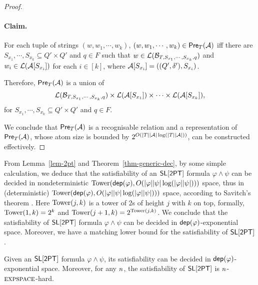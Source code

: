 \begin{proof}


\paragraph{Claim.} For each tuple of strings $(w, w_1,\cdots, w_k)$, $(w, w_1,\cdots, w_k) \in \textsf{Pre}_{T}(\mathcal{A})$ iff there are $S_{x_1}, \cdots, S_{x_k} \subseteq Q' \times Q'$ and $q \in F$ such that $w \in \mathcal{L}(\mathcal{B}_{T, S_{x_1}, \cdots, S_{x_k}, q})$ and $w_i \in \mathcal{L}(\mathcal{A}[S_{x_i}])$ for each $i \in [k]$, where $\mathcal{A}[S_{x_i}]=((Q', \delta'), S_{x_i})$.

\medskip


Therefore, $\textsf{Pre}_{T}(\mathcal{A})$ is a union of
\[\mathcal{L}(\mathcal{B}_{T, S_{x_1}, \cdots, S_{x_k},q}) \times \mathcal{L}(\mathcal{A}[S_{x_1}]) \times \cdots  \times \mathcal{L}(\mathcal{A}[S_{x_k}]), \]
for $S_{x_1}, \cdots, S_{x_k} \subseteq Q' \times Q'$ and $q \in F$. 


We conclude that $\textsf{Pre}_{T}(\mathcal{A})$ is a recognisable relation and a representation of $\textsf{Pre}_{T}(\mathcal{A})$, whose atom size is bounded by $2^{O(|T||\mathcal{A}|\log (|T||\mathcal{A}|))}$, can be constructed effectively.
\end{proof}

From Lemma~\ref{lem-2pt} and Theorem~\ref{thm-generic-dec}, by some simple calculation, we deduce that the satisfiability of an $\textsf{SL}[\textsf{2PT}]$ formula $\varphi \wedge \psi$ can be decided in 
nondeterministic $\mathrm{Tower}(\mathsf{dep}(\varphi), O(|\varphi| |\psi| \log(|\varphi| |\psi|) ))$ space, thus in (deterministic) $\mathrm{Tower}(\mathsf{dep}(\varphi), O(|\varphi| |\psi| \log(|\varphi| |\psi|) ))$ space, according to Savitch's theorem \cite{Savitch70}. Here $\mathrm{Tower}(j, k)$ is a tower of $2$s of height $j$ with $k$ on top, formally, $\mathrm{Tower}(1, k)= 2^k$ and $\mathrm{Tower}(j+1, k) = 2^{\mathrm{Tower}(j, k)}$. We conclude that the satisfiability of $\textsf{SL}[\textsf{2PT}]$ formula $\varphi \wedge \psi$ can be decided in $\mathsf{dep}(\varphi)$-exponential space.
Moreover, we have a matching lower bound for the satisfiability of $\textsf{SL}[\textsf{2PT}]$.
%
\begin{theorem}
Given an $\textsf{SL}[\textsf{2PT}]$ formula $\varphi \wedge \psi$, its satisfiability can be decided in $\mathsf{dep}(\varphi)$-exponential space. Moreover,  for any $n$, the satisfiability of $\textsf{SL}[\textsf{2PT}]$ is $n$-$\textsc{expspace}$-hard.
\end{theorem}

